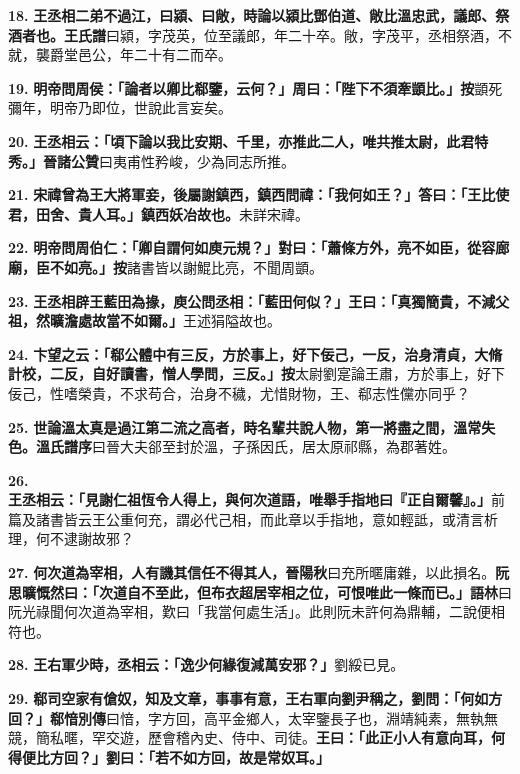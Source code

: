\textbf{18.} \textbf{王丞相二弟不過江，曰潁、曰敞，時論以潁比鄧伯道、敞比溫忠武，議郎、祭酒者也。}{\footnotesize \textbf{王氏譜}曰潁，字茂英，位至議郎，年二十卒。敞，字茂平，丞相祭酒，不就，襲爵堂邑公，年二十有二而卒。}

\textbf{19.} \textbf{明帝問周侯：「論者以卿比郗鑒，云何？」周曰：「陛下不須牽顗比。」}{\footnotesize \textbf{按}顗死彌年，明帝乃即位，世說此言妄矣。}

\textbf{20.} \textbf{王丞相云：「頃下論以我比安期、千里，亦推此二人，唯共推太尉，此君特秀。」}{\footnotesize \textbf{晉諸公贊}曰夷甫性矜峻，少為同志所推。}

\textbf{21.} \textbf{宋禕曾為王大將軍妾，後屬謝鎮西，鎮西問禕：「我何如王？」答曰：「王比使君，田舍、貴人耳。」鎮西妖冶故也。}{\footnotesize 未詳宋禕。}

\textbf{22.} \textbf{明帝問周伯仁：「卿自謂何如庾元規？」對曰：「蕭條方外，亮不如臣，從容廊廟，臣不如亮。」}{\footnotesize \textbf{按}諸書皆以謝鯤比亮，不聞周顗。}

\textbf{23.} \textbf{王丞相辟王藍田為掾，庾公問丞相：「藍田何似？」王曰：「真獨簡貴，不減父祖，然曠澹處故當不如爾。」}{\footnotesize 王述狷隘故也。}

\textbf{24.} \textbf{卞望之云：「郗公體中有三反，方於事上，好下佞己，一反，治身清貞，大脩計校，二反，自好讀書，憎人學問，三反。」}{\footnotesize \textbf{按}太尉劉寔論王肅，方於事上，好下佞己，性嗜榮貴，不求苟合，治身不穢，尤惜財物，王、郗志性儻亦同乎？}

\textbf{25.} \textbf{世論溫太真是過江第二流之高者，時名輩共說人物，第一將盡之間，溫常失色。}{\footnotesize \textbf{溫氏譜序}曰晉大夫郤至封於溫，子孫因氏，居太原祁縣，為郡著姓。}

\textbf{26.} \textbf{王丞相云：「見謝仁祖恆令人得上，與何次道語，唯舉手指地曰『正自爾馨』。」}{\footnotesize 前篇及諸書皆云王公重何充，謂必代己相，而此章以手指地，意如輕詆，或清言析理，何不逮謝故邪？}

\textbf{27.} \textbf{何次道為宰相，人有譏其信任不得其人，}{\footnotesize \textbf{晉陽秋}曰充所暱庸雜，以此損名。}\textbf{阮思曠慨然曰：「次道自不至此，但布衣超居宰相之位，可恨唯此一條而已。」}{\footnotesize \textbf{語林}曰阮光祿聞何次道為宰相，歎曰「我當何處生活」。此則阮未許何為鼎輔，二說便相符也。}

\textbf{28.} \textbf{王右軍少時，丞相云：「逸少何緣復減萬安邪？」}{\footnotesize 劉綏已見。}

\textbf{29.} \textbf{郗司空家有傖奴，知及文章，事事有意，王右軍向劉尹稱之，劉問：「何如方回？」}{\footnotesize \textbf{郗愔別傳}曰愔，字方回，高平金鄉人，太宰鑒長子也，淵靖純素，無執無競，簡私暱，罕交遊，歷會稽內史、侍中、司徒。}\textbf{王曰：「此正小人有意向耳，何得便比方回？」劉曰：「若不如方回，故是常奴耳。」}


